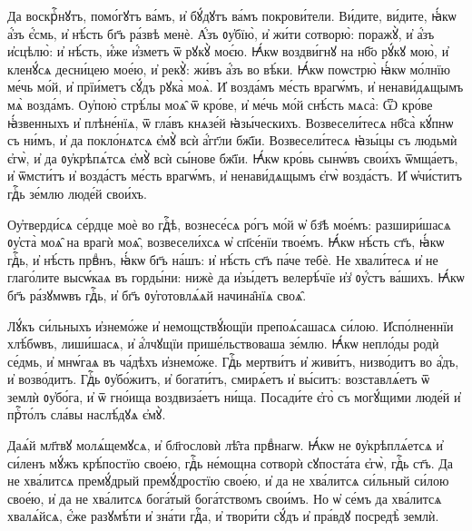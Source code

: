 \hKv Да воскрⷭ҇нꙋтъ, помо́гꙋтъ ва́мъ,  и҆ бꙋ́дꙋтъ ва́мъ покрови́тели. 
\hKv Ви́дите, ви́дите,  ꙗ҆́кѡ а҆́зъ є҆́смь, и҆ нѣ́сть бг҃ъ ра́звѣ менѐ. 
\hKv  А҆́зъ ᲂу҆бїю̀, и҆ жи́ти сотворю̀: поражꙋ̀, и҆ а҆́зъ  и҆сцѣлю̀: и҆ нѣ́сть, и҆́же и҆́зметъ ѿ рꙋкꙋ̀ моє́ю.  
\hKv Ꙗ҆́кѡ воздви́гнꙋ на нб҃о рꙋ́кꙋ мою̀, и҆ кленꙋ́сѧ  десни́цею мое́ю, и҆ рекꙋ̀: жи́въ а҆́зъ во вѣ́ки. 
\hKv  Ꙗ҆́кѡ поѡстрю̀ ꙗ҆́кѡ мо́лнїю ме́чь мо́й, и҆ прїи́метъ  сꙋ́дъ рꙋка̀ моѧ̀. 
\hKv И҆ возда́мъ ме́сть врагѡ́мъ, и҆  ненави́дѧщымъ мѧ̀ возда́мъ. 
\hKv Оу҆пою̀ стрѣ́лы моѧ̑  ѿ кро́ве, и҆ ме́чь мо́й снѣ́сть мѧса̀: 
\hKv Ѿ кро́ве  ꙗ҆́звенныхъ и҆ плѣне́нїѧ, ѿ гла́въ  кнѧзе́й ꙗ҆зы́ческихъ. 
\hKv Возвесели́тесѧ нб҃са̀  кꙋ́пнѡ съ ни́мъ, и҆ да покло́нѧтсѧ є҆мꙋ̀ всѝ а҆́гг҃ли  бж҃їи. 
\hKv Возвесели́тесѧ ꙗ҆зы́цы съ людьмѝ є҆гѡ̀, и҆  да ᲂу҆крѣпѧ́тсѧ є҆мꙋ̀ всѝ сы́нове бж҃їи. 
\hKv Ꙗ҆́кѡ  кро́вь сынѡ́въ свои́хъ ѿмща́етъ, и҆ ѿмсти́тъ и҆  возда́стъ ме́сть врагѡ́мъ, и҆ ненави́дѧщымъ є҆гѡ̀  возда́стъ. 
\hKv И҆ ѡ҆чи́ститъ гдⷭ҇ь зе́млю люде́й  свои́хъ. 

%

\cuLettrine
Оу҆тверди́сѧ се́рдце моѐ во гдⷭ҇ѣ, вознесе́сѧ  ро́гъ мо́й ѡ҆ бз҃ѣ мое́мъ: разшири́шасѧ ᲂу҆ста̀ моѧ̑ на  врагѝ моѧ̑, возвесели́хсѧ ѡ҆ сп҃се́нїи твое́мъ. 
\hKv Ꙗ҆́кѡ  нѣ́сть ст҃ъ, ꙗ҆́кѡ гдⷭ҇ь, и҆ нѣ́сть првⷣнъ, ꙗ҆́кѡ бг҃ъ  на́шъ: и҆ нѣ́сть ст҃ъ па́че тебѐ. 
\hKv Не хвали́тесѧ и҆ не  глаго́лите высѡ́каѧ въ горды́ни: нижѐ да и҆зы́детъ  велерѣ́чїе и҆з̾ ᲂу҆́стъ ва́шихъ. 
\hKv Ꙗ҆́кѡ бг҃ъ  ра́зꙋмѡвъ гдⷭ҇ь, и҆ бг҃ъ ᲂу҆готовлѧ́ѧй начина̑нїѧ своѧ̑.   
%

\hKv Лꙋ́къ си́льныхъ и҆знемо́же и҆ немощствꙋ́ющїи  препоѧ́сашасѧ си́лою. 
\hKv И҆спо́лненнїи хлѣ́бѡвъ,  лиши́шасѧ, и҆ а҆́лчꙋщїи прише́льствоваша зе́млю. 
\hKv Ꙗ҆́кѡ  непло́ды родѝ се́дмь, и҆ мнѡ́гаѧ въ ча́дѣхъ и҆знемо́же.  
\hKv Гдⷭ҇ь мертви́тъ и҆ живи́тъ, низво́дитъ во а҆́дъ, и҆  возво́дитъ. 
\hKv Гдⷭ҇ь ᲂу҆бо́житъ, и҆ богати́тъ, смирѧ́етъ  и҆ вы́ситъ: возставлѧ́етъ ѿ землѝ ᲂу҆бо́га, и҆ ѿ  гно́ища воздвиза́етъ ни́ща. 
\hKv Посади́те є҆го̀ съ  могꙋ́щими люде́й и҆ прⷭ҇то́лъ сла́вы наслѣ́дꙋѧ є҆мꙋ̀. 
%

\hKv Даѧ́й мл҃твꙋ молѧ́щемꙋсѧ, и҆ бл҃гословѝ  лѣ̑та првⷣнагѡ. 
\hKv Ꙗ҆́кѡ не ᲂу҆крѣплѧ́етсѧ и҆  си́ленъ мꙋ́жъ крѣ́постїю свое́ю, гдⷭ҇ь не́мощна сотворѝ  сꙋпоста́та є҆гѡ̀, гдⷭ҇ь ст҃ъ. 
\hKv Да не хва́литсѧ  премꙋ́дрый премꙋ́дростїю свое́ю, и҆ да не хва́литсѧ си́льный  си́лою свое́ю, и҆ да не хва́литсѧ бога́тый бога́тствомъ  свои́мъ. 
\hKv Но ѡ҆ се́мъ да хва́литсѧ хвалѧ́йсѧ, є҆́же  разꙋмѣ́ти и҆ зна́ти гдⷭ҇а, и҆ твори́ти сꙋ́дъ и҆ пра́вдꙋ  посредѣ̀ землѝ.  
%

